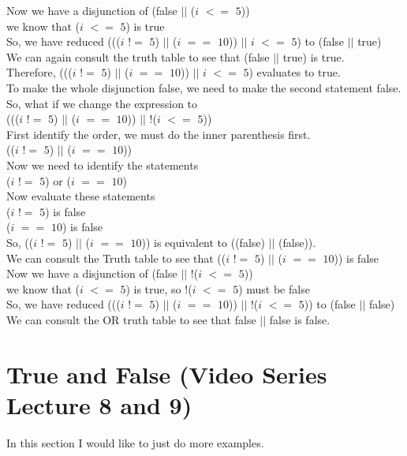 \documentclass[11]{article}
\begin{document}
 Now we have a disjunction of (false $||$ ($i$ $<=$ $5$))\\
 we know that ($i$ $<=$ $5$) is true \\
 So, we have reduced ((($i$ $!=$ $5$) $||$ ($i$ $==$ $10$)) $||$ $i$ $<=$ $5$) to (false $||$ true)\\
 We can again consult the truth table to see that (false $||$ true) is true.\\
 
 Therefore, ((($i$ $!=$ $5$) $||$ ($i$ $==$ $10$)) $||$ $i$ $<=$ $5$) evaluates to true.\\
 
 To make the whole disjunction false, we need to make the second statement false. So, what if we change the expression to \\
 ((($i$ $!=$ $5$) $||$ ($i$ $==$ $10$)) $||$ !($i$ $<=$ $5$))\\
 
 First identify the order, we must do the inner parenthesis first.\\
(($i$ $!=$ $5$) $||$ ($i$ $==$ $10$))\\
Now we need to identify the statements\\
($i$ $!=$ $5$) or ($i$ $==$ $10$) \\
Now evaluate these statements \\
($i$ $!=$ $5$) is false\\
 ($i$ $==$ $10$) is false \\
 So, (($i$ $!=$ $5$) $||$ ($i$ $==$ $10$)) is equivalent to ((false) $||$ (false)).\\
 We can consult the Truth table to see that (($i$ $!=$ $5$) $||$ ($i$ $==$ $10$)) is false\\
 
 Now we have a disjunction of (false $||$ !($i$ $<=$ $5$))\\
 we know that ($i$ $<=$ $5$) is true, so   !($i$ $<=$ $5$) must be false\\
 So, we have reduced ((($i$ $!=$ $5$) $||$ ($i$ $==$ $10$)) $||$ !($i$ $<=$ $5$)) to (false $||$ false)\\
 
 We can consult the OR truth table to see that false $||$ false is false.

\section{True and False (Video Series Lecture 8 and 9)}
In this section I would like to just do more examples.\\
\end{document}
